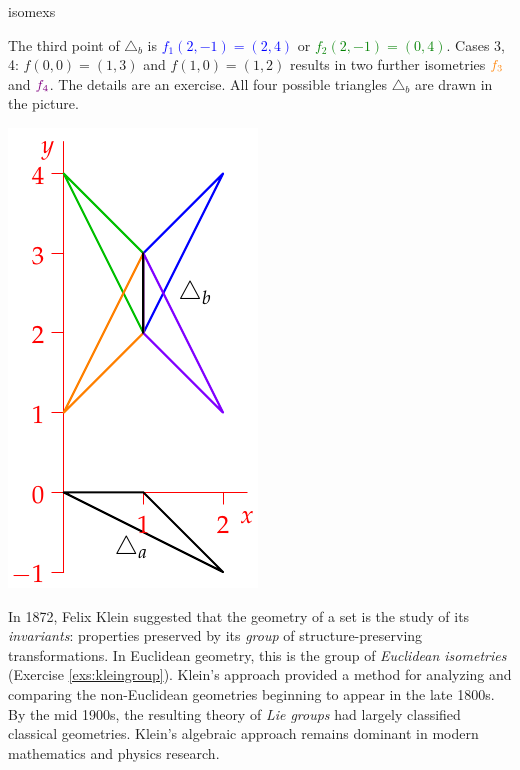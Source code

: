 \begin{examples}{}{isomexs}
\begin{enumerate}
\begin{minipage}[t]{0.75\linewidth}
	  The third point of $\triangle_b$ is \textcolor{blue}{$f_1(2,-1)=(2,4)$} or \textcolor{Green}{$f_2(2,-1)=(0,4)$}.\medbreak
	  Cases 3,\,4: $f(0,0)=(1,3)$ and $f(1,0)=(1,2)$ results in two further isometries $\textcolor{orange}{f_3}$ and $\textcolor{Purple}{f_4}$. The details are an exercise.\medbreak
	  All four possible triangles $\triangle_b$ are drawn in the picture.
	  \end{minipage}
	  \hfill
	  \begin{minipage}[t]{0.24\linewidth}\vspace{-10pt}
	  	\flushright\includegraphics[scale=0.9]{isom-ex}
	  \end{minipage}
	\end{enumerate}
\end{examples}



In 1872, Felix Klein suggested that the geometry of a set is the study of its \emph{invariants}: properties preserved by its \emph{group} of structure-preserving transformations. In Euclidean geometry, this is the group of \emph{Euclidean isometries} (Exercise \ref{exs:kleingroup}). Klein's approach provided a method for analyzing and comparing the non-Euclidean geometries beginning to appear in the late 1800s. By the mid 1900s, the resulting theory of \emph{Lie groups} had largely classified classical geometries. Klein's algebraic approach remains dominant in modern mathematics and physics research.


